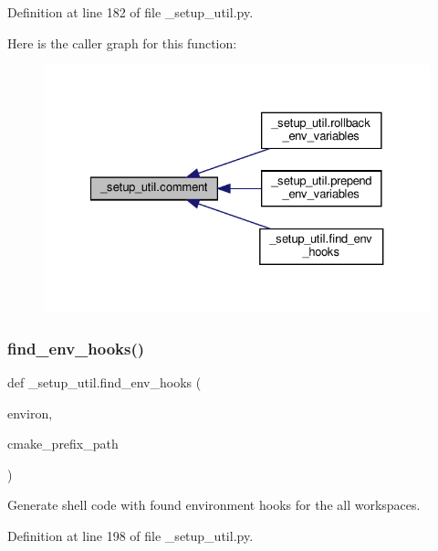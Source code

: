 Definition at line 182 of file \+\_\+setup\+\_\+util.\+py.

Here is the caller graph for this function\+:
\nopagebreak
\begin{figure}[H]
\begin{center}
\leavevmode
\includegraphics[width=327pt]{namespace__setup__util_abe8c95c4cfe8b1374dacd5f91d984353_icgraph}
\end{center}
\end{figure}
\mbox{\label{namespace__setup__util_a73de35ca77f260af6691470342ab49ce}} 
\subsubsection{\texorpdfstring{find\+\_\+env\+\_\+hooks()}{find\_env\_hooks()}}
{\footnotesize\ttfamily def \+\_\+setup\+\_\+util.\+find\+\_\+env\+\_\+hooks (\begin{DoxyParamCaption}\item[{}]{environ,  }\item[{}]{cmake\+\_\+prefix\+\_\+path }\end{DoxyParamCaption})}

\begin{DoxyVerb}Generate shell code with found environment hooks
for the all workspaces.
\end{DoxyVerb}
 

Definition at line 198 of file \+\_\+setup\+\_\+util.\+py.

